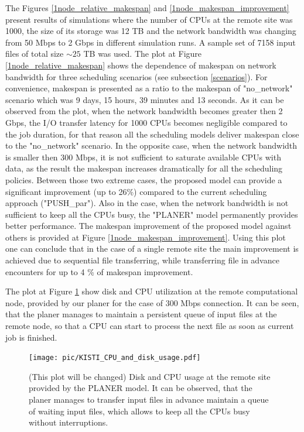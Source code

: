 \documentclass{svjour3}                     %
\begin{document}
The Figures \ref{1node_relative_makespan} and \ref{1node_makespan_improvement} present results of simulations where the number of CPUs at the remote site was 1000, the size of its storage was 12 TB and the network bandwidth was changing from 50 Mbps to 2 Gbps in different simulation runs. A sample set of 7158 input files of total size $\sim25$ TB was used. The plot at Figure \ref{1node_relative_makespan} shows the dependence of makespan on network bandwidth for three scheduling scenarios (see subsection \ref{scenarios}). For convenience, makespan is presented as a ratio to the makespan of "no\_network" scenario which was 9 days, 15 hours, 39 minutes and 13 seconds. As it can be observed from the plot, when the network bandwidth becomes greater then 2 Gbps, the I/O transfer latency for 1000 CPUs becomes negligible compared to the job duration, for that reason all the scheduling models deliver makespan close to the "no\_network" scenario. In the opposite case, when the network bandwidth is smaller then 300 Mbps, it is not sufficient to saturate available CPUs with data, as the result the makespan increases dramatically for all the scheduling policies. Between those two extreme cases, the proposed model can provide a significant improvement (up to 26\%) compared to the current scheduling approach ("PUSH\_par"). Also in the case, when the network bandwidth is not sufficient to keep all the CPUs busy, the "PLANER" model permanently provides better performance. The makespan improvement of the proposed model against others is provided at Figure \ref{1node_makespan_improvement}. Using this plot one can conclude that in the case of a single remote site the main improvement is achieved due to sequential file transferring, while transferring file in advance encounters for up to 4 \% of makespan improvement.

The plot at Figure \ref{utilization} show disk and CPU utilization at the remote computational node, provided by our planer for the case of 300 Mbps connection. It can be seen, that the planer manages to maintain a persistent queue of input files at the remote node, so that a CPU can start to process the next file as soon as current job is finished.

\begin{figure}[h]
\centering
    \texttt{[image: pic/KISTI\_CPU\_and\_disk\_usage.pdf]}
    \caption{(This plot will be changed) Disk and CPU usage at the remote site provided by the PLANER model. It can be observed, that the planer manages to transfer input files in advance maintain a queue of waiting input files, which allows to keep all the CPUs busy without interruptions.}
    \label{utilization}
\end{figure}
\end{document}
